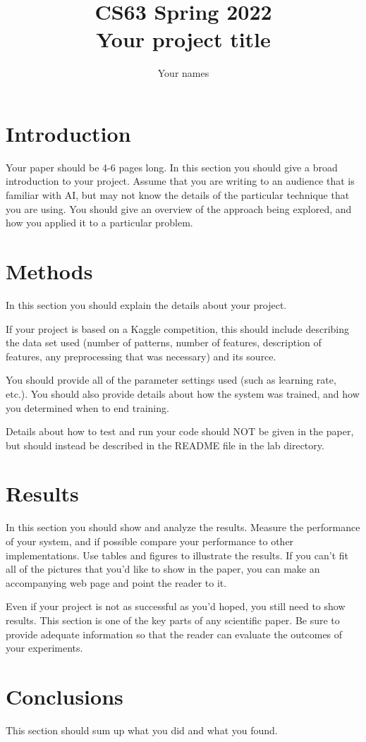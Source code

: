 \documentclass[11pt]{article}
\title{CS63 Spring 2022\\Your project title}
\author{Your names}
\date{}
\begin{document}
\maketitle

\section{Introduction}

Your paper should be 4-6 pages long.  In this section you should give
a broad introduction to your project.  Assume that you are writing to
an audience that is familiar with AI, but may not know the details of
the particular technique that you are using.  You should give an
overview of the approach being explored, and how you applied it to a
particular problem. 

\section{Methods}

In this section you should explain the details about your project.

If your project is based on a Kaggle competition, this should include
describing the data set used (number of patterns, number of features,
description of features, any preprocessing that was necessary) and its
source.

You should provide all of the parameter settings used (such as
learning rate, etc.).  You should also provide details about how the
system was trained, and how you determined when to end training.

Details about how to test and run your code should NOT be given in the
paper, but should instead be described in the README file in the lab
directory. 

\section{Results}

In this section you should show and analyze the results.  Measure the
performance of your system, and if possible compare your performance
to other implementations. Use tables and figures to illustrate the
results.  If you can't fit all of the pictures that you'd like to show
in the paper, you can make an accompanying web page and point the
reader to it.

Even if your project is not as successful as you'd hoped, you still
need to show results.  This section is one of the key parts of any
scientific paper.  Be sure to provide adequate information so that the
reader can evaluate the outcomes of your experiments. 

\section{Conclusions}

This section should sum up what you did and what you found.  
\end{document}
